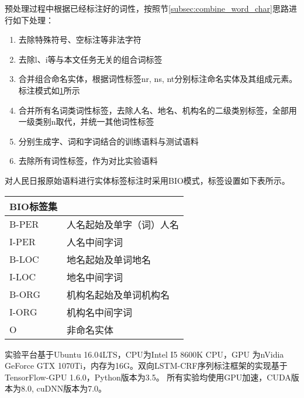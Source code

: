 预处理过程中根据已经标注好的词性，按照节\ref{subsec:combine_word_char}思路进行如下处理：
\begin{enumerate}[\indent(1)]
    \item 去除特殊符号、空标注等非法字符
    \item 去除l、i等与本文任务无关的组合词标签
    \item 合并组合命名实体，根据词性标签nr, ns, nt分别标注命名实体及其组成元素。标注模式如\ref{tab:label_schema}所示
    \item 合并所有名词类词性标签，去除人名、地名、机构名的二级类别标签，全部用一级类别n取代，并统一其他词性标签
    \item 分别生成字、词和字词结合的训练语料与测试语料
    \item 去除所有词性标签，作为对比实验语料
\end{enumerate}

对人民日报原始语料进行实体标签标注时采用BIO模式，标签设置如下表所示。

\begin{table}[H]
    \centering
    \begin{tabular}{ll}
        \toprule
            BIO标签集\\
        \midrule
        B-PER & 人名起始及单字（词）人名 \\
        I-PER & 人名中间字词 \\
        B-LOC & 地名起始及单词地名 \\
        I-LOC & 地名中间字词 \\
        B-ORG & 机构名起始及单词机构名 \\
        I-ORG & 机构名中间字词 \\
        O & 非命名实体\\
        \bottomrule
    \end{tabular}
    \label{tab:label_schema}
\end{table}

实验平台基于Ubuntu 16.04LTS，CPU为Intel I5 8600K CPU，GPU 为nVidia GeForce GTX 1070Ti，内存为16G。双向LSTM-CRF序列标注框架的实现基于TensorFlow-GPU 1.6.0，Python版本为3.5。
所有实验均使用GPU加速，CUDA版本为8.0, cuDNN版本为7.0。

